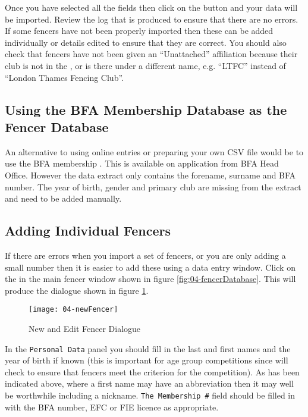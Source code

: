 \documentclass[a4paper,11pt]{memoir}
\begin{document}
Once you have selected all the fields then click on the  button and your data will be imported. Review the log that is produced to ensure that there are no errors. If some fencers have not been properly imported then these can be added individually or details edited to ensure that they are correct. You should also check that fencers have not been given an ``Unattached'' affiliation because their club is not in the , or is there under a different name, e.g. ``LTFC'' instead of ``London Thames Fencing Club''. 

\subsection{Using the BFA Membership Database as the Fencer Database}

An alternative to using online entries or preparing your own CSV file would be to use the BFA membership . This is available on application from BFA Head Office. However the data extract only contains the forename, surname and BFA number. The year of birth, gender and primary club are missing from the extract and need to be added manually.

\subsection{Adding Individual Fencers}
If there are errors when you import a set of fencers, or you are only adding a small number then it is easier to add these using a data entry window. Click on the  in the main fencer window shown in figure \ref{fig:04-fencerDatabase}. This will produce the dialogue shown in figure \ref{fig:04-newFencer}.

\begin{figure}[!ht]
 \centering
 \texttt{[image: 04-newFencer]}
 \caption{New and Edit Fencer Dialogue} \label{fig:04-newFencer}
\end{figure}

In the \texttt{Personal Data} panel you should fill in the last and first names and the year of birth if known (this is important for age group competitions since \fencingtime{} will check to ensure that fencers meet the criterion for the competition). As has been indicated above, where a first name may have an abbreviation then it may well be worthwhile including a nickname. \texttt{The Membership \#} field should be filled in with the BFA number, EFC or FIE licence as appropriate.
\end{document}

